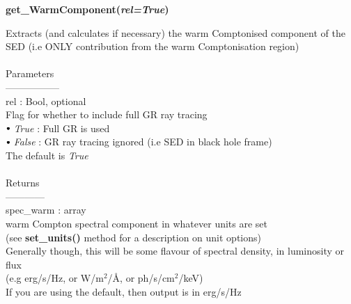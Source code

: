 \documentclass[a4paper, 11pt, times, onecolumn]{article}
\newcommand{\sbt}{\,\begin{picture}(-1,1)(-1,-3)\circle*{3}\end{picture}\ }
\begin{document}
\noindent
{\bf get\_WarmComponent(\textit{rel=True})}
\begin{adjustwidth}{1.5cm}{}

	\noindent
	Extracts (and calculates if necessary) the warm Comptonised component of the SED (i.e ONLY contribution from the warm Comptonisation region)
	\\~\\
	Parameters\\
	-----------------\\
	\indent rel : Bool, optional \\
	\indent \indent Flag for whether to include full GR ray tracing \\
	\indent \indent \indent $\sbt$ {\it True} : Full GR is used \\
	\indent \indent \indent $\sbt$ {\it False} : GR ray tracing ignored (i.e SED in black hole frame) \\
	\indent \indent The default is {\it True}
	\\~\\
	Returns \\
	------------\\ 
	\indent spec\_warm : array \\
	\indent \indent warm Compton spectral component in whatever units are set \\
	\indent \indent (see {\bf set\_units()} method for a description on unit options) \\
	\indent \indent Generally though, this will be some flavour of spectral density, in luminosity or flux \\
	\indent \indent  (e.g erg/s/Hz, or W/m$^{2}$/\AA,  or ph/s/cm$^{2}$/keV) \\
	\indent \indent If you are using the default, then output is in erg/s/Hz

\end{adjustwidth}

\vspace{1cm}
\end{document}
